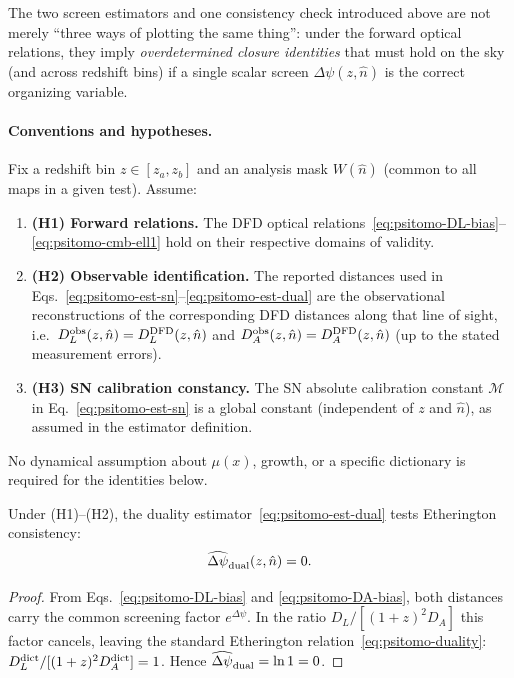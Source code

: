 The two screen estimators and one consistency check introduced above are not merely ``three ways of plotting the same thing'':
under the forward optical relations, they imply \emph{overdetermined closure identities} that must hold
on the sky (and across redshift bins) if a single scalar screen $\Delta\psi(z,\hat n)$ is the correct
organizing variable.

\paragraph{Conventions and hypotheses.}
Fix a redshift bin $z\in[z_a,z_b]$ and an analysis mask $W(\hat n)$ (common to all maps in a given test).
Assume:
\begin{enumerate}
\item \textbf{(H1) Forward relations.} The DFD optical relations~\eqref{eq:psitomo-DL-bias}--\eqref{eq:psitomo-cmb-ell1} hold on their respective domains of validity.
\item \textbf{(H2) Observable identification.} The reported distances used in Eqs.~\eqref{eq:psitomo-est-sn}--\eqref{eq:psitomo-est-dual} are the observational reconstructions of the corresponding DFD distances along that line of sight, i.e.\ $D_L^{\rm obs}(z,\hat n)=D_L^{\rm DFD}(z,\hat n)$ and $D_A^{\rm obs}(z,\hat n)=D_A^{\rm DFD}(z,\hat n)$ (up to the stated measurement errors).
\item \textbf{(H3) SN calibration constancy.} The SN absolute calibration constant $\mathcal{M}$ in Eq.~\eqref{eq:psitomo-est-sn} is a global constant (independent of $z$ and $\hat n$), as assumed in the estimator definition.
\end{enumerate}
No dynamical assumption about $\mu(x)$, growth, or a specific dictionary is required for the identities below.

\begin{theorem}\label{thm:duality-inversion}
Under (H1)--(H2), the duality estimator~\eqref{eq:psitomo-est-dual} tests Etherington consistency:
\begin{equation}
\widehat{\Delta\psi}_{\rm dual}(z,\hat n)=0.
\label{eq:closure-dual-exact}
\end{equation}
\end{theorem}

\begin{proof}
From Eqs.~\eqref{eq:psitomo-DL-bias} and \eqref{eq:psitomo-DA-bias}, both distances carry the common screening factor $e^{\Delta\psi}$. In the ratio $D_L/[(1+z)^2 D_A]$ this factor cancels, leaving the standard Etherington relation~\eqref{eq:psitomo-duality}: $D_L^{\rm dict}/[(1+z)^2 D_A^{\rm dict}]=1$. Hence $\widehat{\Delta\psi}_{\rm dual}=\ln 1=0$.
\end{proof}

